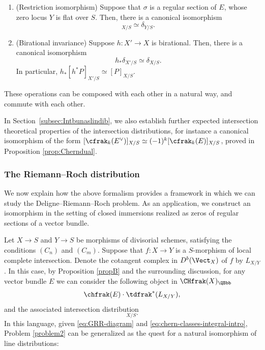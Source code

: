 \begin{thm}
\begin{enumerate}
\item\label{item:thmE-5} (Restriction isomorphism) Suppose that $\sigma$ is a regular section of $E$, whose zero locus $Y$ is flat over $S$. Then, there is a canonical isomorphism
\begin{displaymath}
[ \cfrak_{r}(E) ]_{X/S} \simeq \delta_{Y/S}.
\end{displaymath}
\item\label{item:prop-int-dist-birational1} (Birational invariance) Suppose $h \colon X' \to X$ is birational. Then, there is a canonical isomorphism
\begin{displaymath}
h_\ast \delta_{X'/S}\simeq \delta_{X/S}.
\end{displaymath}
In particular, $h_{\ast}[h^{\ast}P]_{X'/S}\simeq [P]_{X/S}$.
\end{enumerate}
These operations can be composed with each other in a natural way, and commute with each other.

\end{thm}
In Section~\ref{subsec:Intbunaslindib}, we also establish further expected intersection theoretical properties of the intersection distributions, for instance a canonical isomorphism of the form $[\cfrak_{k}(E^{\vee})]_{X/S}\simeq (-1)^{k}[\cfrak_{k}(E)]_{X/S}$, proved in Proposition \ref{prop:Cherndual}.

\subsubsection*{The Riemann--Roch distribution}
We now explain how the above formalism provides a framework in which we can study the Deligne--Riemann--Roch problem. As an application, we construct an isomorphism in the setting of closed immersions realized as zeros of regular sections of a vector bundle.

Let $X\to S$ and $Y\to S$ be morphisms of divisorial schemes, satisfying the conditions $(C_{n})$ and $(C_{m})$. Suppose that $f\colon X\to Y$ is a $S$-morphism of local complete intersection. Denote the cotangent complex in $D^{b}(\Vect_X)$ of $f$ by $L_{X/Y}$. In this case, by Proposition \ref{propB} and the surrounding discussion, for any vector bundle $E$ we can consider the following object in $\CHfrak(X)_{\QBbb}$
\begin{displaymath}
\chfrak(E) \cdot \tdfrak^\ast(L_{X/Y}),
\end{displaymath}
and the associated intersection distribution
\begin{displaymath}
[\chfrak(E) \cdot \tdfrak^{\ast}(L_{X/Y})]_{X/S}.
\end{displaymath}
In this language, given \eqref{eq:GRR-diagram} and \eqref{eq:chern-classes-integral-intro}, Problem \ref{problem2} can be generalized as the quest for a natural isomorphism of line distributions:

